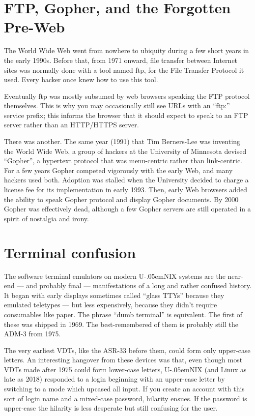 \documentclass[12pt,letterpaper]{article}
\newcommand{\mc}{\small}
\newcommand{\acro}[1]{{\mc #1\spacefactor1000}}
\def\UNIX/{{\mc U\kern-.05emNIX\spacefactor1000}}%
\begin{document}
\section{FTP, Gopher, and the Forgotten Pre-Web}
The World Wide Web went from nowhere to ubiquity during a few short years in
the early 1990s. Before that, from 1971 onward, file transfer between Internet
sites was normally done with a tool named ftp, for the File Transfer Protocol
it used. Every hacker once knew how to use this tool.

Eventually ftp was mostly subsumed by web browsers speaking the \acro{FTP} protocol
themselves. This is why you may occasionally still see \acro{URL}s with an ``ftp:''
service prefix; this informs the browser that it should expect to speak to an
\acro{FTP} server rather than an \acro{HTTP/HTTPS} server.

There was another. The same year (1991) that Tim Berners-Lee was inventing the
World Wide Web, a group of hackers at the University of Minnesota devised
``Gopher'', a hypertext protocol that was menu-centric rather than link-centric.
For a few years Gopher competed vigorously with the early Web, and many hackers
used both. Adoption was stalled when the University decided to charge a license
fee for its implementation in early 1993. Then, early Web browsers added the
ability to speak Gopher protocol and display Gopher documents. By 2000 Gopher
was effectively dead, although a few Gopher servers are still operated in a
spirit of nostalgia and irony.

\section{Terminal confusion}
The software terminal emulators on modern \UNIX/ systems are the near-end --- and
probably final --- manifestations of a long and rather confused history. It began
with early displays sometimes called ``glass \acro{TTY}s'' because they emulated
teletypes --- but less expensively, because they didn't require consumables like
paper. The phrase ``dumb terminal'' is equivalent. The first of these was shipped
in 1969. The best-remembered of them is probably still the \acro{ADM-3} from 1975.

The very earliest \acro{VDT}s, like the \acro{ASR-33} before them, could form only upper-case
letters. An interesting hangover from these devices was that, even though most
\acro{VDT}s made after 1975 could form lower-case letters, \UNIX/ (and Linux as late as
2018) responded to a login beginning with an upper-case letter by switching to
a mode which upcased all input. If you create an account with this sort of
login name and a mixed-case password, hilarity ensues. If the password is
upper-case the hilarity is less desperate but still confusing for the user.
\end{document}
